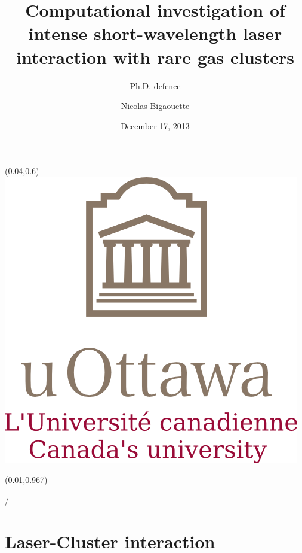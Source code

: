 \documentclass{beamer}
\title[Ph.D. defence]{Computational investigation of intense short-wavelength laser interaction with rare gas clusters}
\subtitle{Ph.D. defence}
\author{Nicolas Bigaouette}
\date[December 17, 2013]{December 17, 2013}
\institute{Computational Nanophotonics Group
\newline
Physics Department -- University of Ottawa}
\makeatletter
\newcommand{\framenumber}{
\begin{textblock}{0}(0.01,0.967)
\begin{scriptsize}
{\color{gray}\insertframenumber/\inserttotalframenumber}
\end{scriptsize}
\end{textblock}
}
\makeatother
\begin{document}
\begin{frame}{}
\titlepage
\begin{textblock}{0}(0.04,0.6)
\includegraphics[width=0.22\paperwidth]{figures/UofO}
\end{textblock}
\end{frame}

\setcounter{framenumber}{0}

\begin{frame}\framenumber
\tableofcontents
\end{frame}


\section{Laser-Cluster interaction}

\end{document}
